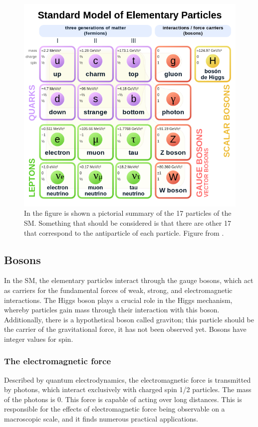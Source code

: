 \begin{figure}[!htb]
\centering
\includegraphics[scale=0.5]{Figures/Chapter1/Standard_Model_of_Elementary_Particles.png}

        \caption{In the figure is shown a pictorial summary of the  17 particles of the SM. Something that should be considered is that there are other 17 that correspond to the antiparticle of each particle. Figure from \cite{SM_Table}.} 
\label{fig:SM}
\end{figure}
 
\subsection{Bosons}
In the SM, the elementary particles interact through the gauge bosons, which act as carriers for the fundamental forces of weak, strong, and electromagnetic interactions. The Higgs boson plays a crucial role in the Higgs mechanism, whereby particles gain mass through their interaction with this boson. Additionally, there is a hypothetical boson called graviton; this particle should be the carrier of the gravitational force, it has not been observed yet. Bosons have integer values for spin.  

\subsubsection{The electromagnetic force}
Described by quantum electrodynamics, the electromagnetic force is transmitted by photons, which interact exclusively with charged spin 1/2 particles. The mass of the photons is 0. This force is capable of acting over long distances. This is responsible for the effects of electromagnetic force being observable on a macroscopic scale, and it finds numerous practical applications.

